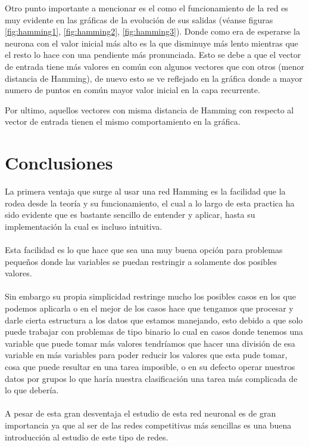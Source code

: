 \documentclass[12pt, titlepage]{article}
\begin{document}
    Otro punto importante a mencionar es el como el funcionamiento de la red es muy evidente en las gráficas de la evolución de sus salidas (véanse figuras \ref{fig:hamming1}, \ref{fig:hamming2}, \ref{fig:hamming3}). Donde como era de esperarse la neurona con el valor inicial más alto es la que disminuye más lento mientras que el resto lo hace con una pendiente más pronunciada. Esto se debe a que el vector de entrada tiene más valores en común con algunos vectores que con otros (menor distancia de Hamming), de nuevo esto se ve reflejado en la gráfica donde a mayor numero de puntos en común mayor valor inicial en la capa recurrente.
    
    Por ultimo, aquellos vectores con misma distancia de Hamming con respecto al vector de entrada tienen el mismo comportamiento en la gráfica.
    \newpage
    \section{Conclusiones}
    La primera ventaja que surge al usar una red Hamming es la facilidad que la rodea desde la teoría y su funcionamiento, el cual a lo largo de esta practica ha sido evidente que es bastante sencillo de entender y aplicar, hasta su implementación la cual es incluso intuitiva.
    \\\\
    Esta facilidad es lo que hace que sea una muy buena opción para problemas pequeños donde las variables se puedan restringir a solamente dos posibles valores.
    \\\\
    Sin embargo su propia simplicidad restringe mucho los posibles casos en los que podemos aplicarla o en el mejor de los casos hace que tengamos que procesar y darle cierta estructura a los datos que estamos manejando, esto debido a que solo puede trabajar con problemas de tipo binario lo cual en casos donde tenemos una variable que puede tomar más valores tendríamos que hacer una división de esa variable en más variables para poder reducir los valores que esta pude tomar, cosa que puede resultar en una tarea imposible, o en su defecto operar nuestros datos por grupos lo que haría nuestra clasificación una tarea más complicada de lo que debería.
    \\\\
    A pesar de esta gran desventaja el estudio de esta red neuronal es de gran importancia ya que al ser de las redes competitivas más sencillas es una buena introducción al estudio de este tipo de redes.
    \newpage
    
    
    \newpage
\end{document}
